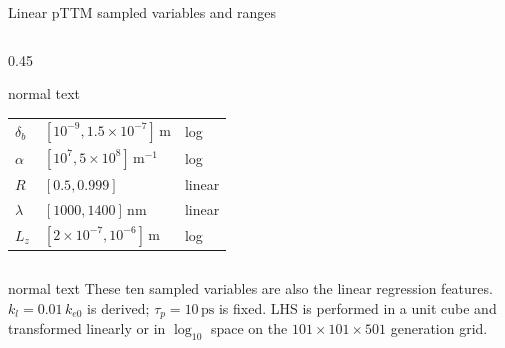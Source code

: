 \documentclass[aspectratio=169,10pt]{beamer}
\begin{document}
\begin{frame}[t]{Linear pTTM sampled variables and ranges}
\begin{columns}[T,totalwidth=0.94\textwidth]
\begin{column}{0.45\textwidth}
\begin{beamercolorbox}[wd=\linewidth,sep=0.45em]{normal text}
\begin{tabular}{@{}lll@{}}
          \(\delta_b\) & \([10^{-9},1.5\times10^{-7}]\,\mathrm{m}\) & log \\
          \(\alpha\) & \([10^7,5\times10^8]\,\mathrm{m^{-1}}\) & log \\
          \(R\) & \([0.5,0.999]\) & linear \\
          \(\lambda\) & \([1000,1400]\,\mathrm{nm}\) & linear \\
          \(L_z\) & \([2\times10^{-7},10^{-6}]\,\mathrm{m}\) & log \\
        \end{tabular}
      \end{beamercolorbox}
    \end{column}
  \end{columns}
  \vspace{0.14cm}
  \begin{beamercolorbox}[wd=0.92\textwidth,sep=0.48em]{normal text}
    \scriptsize
    These ten sampled variables are also the linear regression features. \(k_l=0.01\,k_{e0}\) is derived; \(\tau_p=10\,\mathrm{ps}\) is fixed. LHS is performed in a unit cube and transformed linearly or in \(\log_{10}\) space on the \(101\times101\times501\) generation grid.
  \end{beamercolorbox}
\end{frame}
\end{document}
